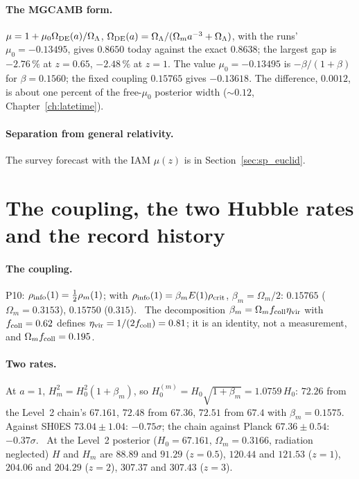 \paragraph{The MGCAMB form.} $\mu=1+\mu_0\Omega_{\rm DE}(a)/\Omega_\Lambda$, $\Omega_{\rm DE}(a)=\Omega_\Lambda/(\Omega_ma^{-3}+\Omega_\Lambda)$, with the
runs' $\mu_0=-0.13495$, gives $0.8650$ today against the exact $0.8638$; the largest gap is $-2.76\,\%$ at $z=0.65$, $-2.48\,\%$ at $z=1$. The value
$\mu_0=-0.13495$ is $-\beta/(1+\beta)$ for $\beta=0.1560$; the fixed coupling $0.15765$ gives $-0.13618$. The difference, $0.0012$, is about one percent of the
free-$\mu_0$ posterior width ($\sim0.12$, Chapter~\ref{ch:latetime}). \calc

\paragraph{Separation from general relativity.} The survey forecast with the IAM $\mu(z)$ is in Section~\ref{sec:sp_euclid}.

\section{The coupling, the two Hubble rates and the record history}\label{app:der:coupling}
\paragraph{The coupling.} P10: $\rho_{\rm info}(1)=\tfrac12\rho_m(1)$; with $\rho_{\rm info}(1)=\beta_mE(1)\rho_{\rm crit}$, $\beta_m=\Omega_m/2$:
$0.15765$ ($\Omega_m=0.3153$), $0.15750$ ($0.315$). \prediction\ The decomposition $\beta_m=\Omega_mf_{\rm coll}\eta_{\rm vir}$ with $f_{\rm coll}=0.62$
defines $\eta_{\rm vir}=1/(2f_{\rm coll})=0.81$; it is an identity, not a measurement, and $\Omega_mf_{\rm coll}=0.195$. \calc

\paragraph{Two rates.} At $a=1$, $H_m^2=H_0^2(1+\beta_m)$, so $H_0^{(m)}=H_0\sqrt{1+\beta_m}=1.0759\,H_0$: $72.26$ from the Level~2 chain's $67.161$,
$72.48$ from $67.36$, $72.51$ from $67.4$ with $\beta_m=0.1575$. Against SH0ES $73.04\pm1.04$: $-0.75\sigma$; the chain against Planck $67.36\pm0.54$:
$-0.37\sigma$. \calc\ At the Level~2 posterior ($H_0=67.161$, $\Omega_m=0.3166$, radiation neglected) $H$ and $H_m$ are $88.89$ and $91.29$ ($z=0.5$),
$120.44$ and $121.53$ ($z=1$), $204.06$ and $204.29$ ($z=2$), $307.37$ and $307.43$ ($z=3$). \calc

